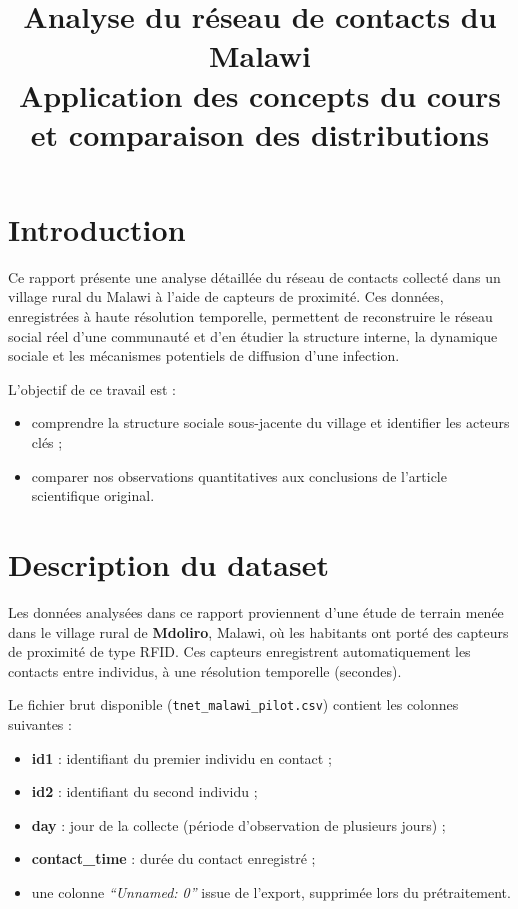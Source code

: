 \documentclass[10pt,twocolumn]{article}
\title{\textbf{Analyse du réseau de contacts du Malawi} \\ 
\large Application des concepts du cours et comparaison des distributions}
\author{}
\date{}
\begin{document}
\maketitle



\section{Introduction}

Ce rapport présente une analyse détaillée du réseau de contacts 
collecté dans un village rural du Malawi à l’aide de capteurs de proximité. 
Ces données, enregistrées à haute résolution temporelle, permettent de reconstruire 
le réseau social réel d’une communauté et d’en étudier la structure interne, 
la dynamique sociale et les mécanismes potentiels de diffusion d’une infection.

L’objectif de ce travail est  :

\begin{itemize}
    \item comprendre la structure sociale sous-jacente du village et identifier les acteurs clés ;
    \item comparer nos observations quantitatives aux conclusions de l’article scientifique original.
\end{itemize}


\section{Description du dataset}

Les données analysées dans ce rapport proviennent d’une étude de terrain menée dans le village rural de \textbf{Mdoliro},
 Malawi, où les habitants ont porté des capteurs de proximité de type RFID. 
Ces capteurs enregistrent automatiquement les contacts entre individus, 
à une résolution temporelle (secondes).

Le fichier brut disponible (\texttt{tnet\_malawi\_pilot.csv}) contient les colonnes suivantes :

\begin{itemize}
    \item \textbf{id1} : identifiant du premier individu en contact ;
    \item \textbf{id2} : identifiant du second individu ;
    \item \textbf{day} : jour de la collecte (période d’observation de plusieurs jours) ;
    \item \textbf{contact\_time} : durée du contact enregistré ;
    \item une colonne \textit{``Unnamed: 0''} issue de l’export, supprimée lors du prétraitement.
\end{itemize}
\end{document}

